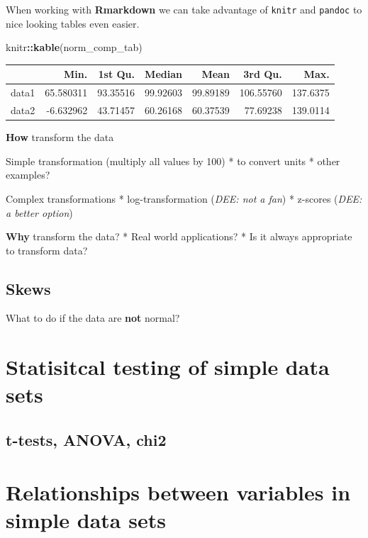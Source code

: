 \documentclass[
]{book}
\newenvironment{Shaded}{\begin{snugshade}}{\end{snugshade}}
\newcommand{\FunctionTok}[1]{\textcolor[rgb]{0.13,0.29,0.53}{\textbf{#1}}}
\newcommand{\NormalTok}[1]{#1}
\newcommand{\SpecialCharTok}[1]{\textcolor[rgb]{0.81,0.36,0.00}{\textbf{#1}}}
\begin{document}
When working with \textbf{Rmarkdown} we can take advantage of \texttt{knitr} and \texttt{pandoc} to nice looking tables even easier.

\begin{Shaded}
\begin{Highlighting}[]
\NormalTok{knitr}\SpecialCharTok{::}\FunctionTok{kable}\NormalTok{(norm\_comp\_tab)}
\end{Highlighting}
\end{Shaded}

\begin{tabular}{l|r|r|r|r|r|r}
\hline
  & Min. & 1st Qu. & Median & Mean & 3rd Qu. & Max.\\
\hline
data1 & 65.580311 & 93.35516 & 99.92603 & 99.89189 & 106.55760 & 137.6375\\
\hline
data2 & -6.632962 & 43.71457 & 60.26168 & 60.37539 & 77.69238 & 139.0114\\
\hline
\end{tabular}

\textbf{How} transform the data

Simple transformation (multiply all values by 100)
* to convert units
* other examples?

Complex transformations
* log-transformation (\emph{DEE: not a fan})
* z-scores (\emph{DEE: a better option})

\textbf{Why} transform the data?
* Real world applications?
* Is it always appropriate to transform data?

\hypertarget{skews}{%
\subsection{Skews}\label{skews}}

What to do if the data are \textbf{not} normal?

\hypertarget{statisitcal-testing-of-simple-data-sets}{%
\section{Statisitcal testing of simple data sets}\label{statisitcal-testing-of-simple-data-sets}}

\hypertarget{t-tests-anova-chi2}{%
\subsection{t-tests, ANOVA, chi2}\label{t-tests-anova-chi2}}

\hypertarget{relationships-between-variables-in-simple-data-sets}{%
\section{Relationships between variables in simple data sets}\label{relationships-between-variables-in-simple-data-sets}}
\end{document}
